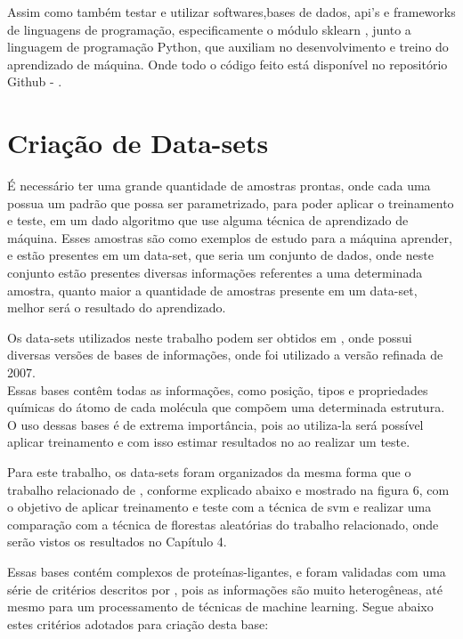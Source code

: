 \documentclass[tcc, capa]{texucpel}
\begin{document}
Assim como também testar e utilizar softwares,bases de dados, api's e frameworks de linguagens de programação, especificamente o módulo sklearn \cite{scikit-learn}, junto a linguagem de programação Python, que auxiliam no desenvolvimento e treino do aprendizado de máquina.
Onde todo o código feito está disponível no repositório Github - \citet{githubgianluca}.

\section{Criação de Data-sets}
É necessário ter uma grande quantidade de amostras prontas, onde cada uma possua um padrão que possa ser parametrizado, para poder aplicar o treinamento e teste, em um dado algoritmo que use alguma técnica de aprendizado de máquina.
Esses amostras são como exemplos de estudo para a máquina aprender, e estão presentes em um data-set, que seria um conjunto de dados, onde neste conjunto estão presentes diversas informações referentes a uma determinada amostra, quanto maior a quantidade de amostras presente em um data-set, melhor será o resultado do aprendizado. 

Os data-sets utilizados neste trabalho podem ser obtidos em \citeauthor{sitepdbbind}, onde possui diversas versões de bases de informações, onde foi utilizado a versão refinada de 2007. \\
Essas bases contêm todas as informações, como posição, tipos e propriedades químicas do átomo de cada molécula que compõem uma determinada estrutura.\\
O uso dessas bases é de extrema importância, pois ao utiliza-la será possível aplicar treinamento e com isso estimar resultados no ao realizar um teste. 

Para este trabalho, os data-sets foram organizados da mesma forma que o trabalho relacionado de \citeauthor{ballester2010machine}, conforme explicado abaixo e mostrado na figura 6, com o objetivo de aplicar treinamento e teste com a técnica de svm e realizar uma comparação com a técnica de florestas aleatórias do trabalho relacionado, onde serão vistos os resultados no Capítulo 4.

Essas bases contém complexos de proteínas-ligantes, e foram validadas com uma série de critérios descritos por \cite{cheng2009comparative}, pois as informações são muito heterogêneas, até mesmo para um processamento de técnicas de machine learning. 
Segue abaixo estes critérios adotados para criação desta base:
\end{document}
